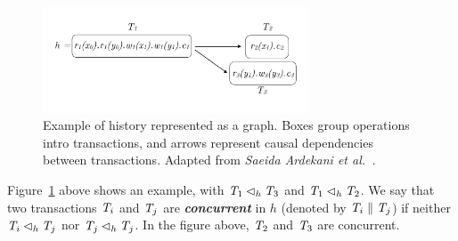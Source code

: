 \begin{figure}[h]
  \centering
  \vspace{-0.4cm}
  \includegraphics[width=0.7\textwidth]{figures/history.pdf}
  \vspace{-1cm}
  \caption{Example of history represented as a graph. Boxes group operations intro transactions, and arrows represent causal dependencies between transactions. Adapted from \em{Saeida Ardekani et al.~\citep{ardekani_nmsi}}.}
  \label{fig:history}
\end{figure}

Figure~\ref{fig:history} above shows an example, with $\mathit{T}_1 \lhd_h \mathit{T}_3$ and $\mathit{T}_1 \lhd_h \mathit{T}_2$. We say that two transactions $\mathit{T}_i$ and $\mathit{T}_j$ are \textbf{\em concurrent} in $h$ (denoted by $\mathit{T}_i \parallel \mathit{T}_j$) if neither $\mathit{T}_i \lhd_h \mathit{T}_j$ nor $\mathit{T}_j \lhd_h \mathit{T}_j$. In the figure above, $\mathit{T}_2$ and $\mathit{T}_3$ are concurrent.





